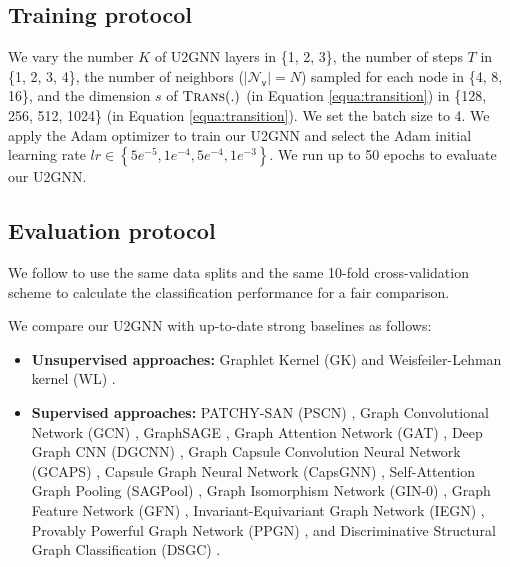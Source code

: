 \documentclass[twoside,leqno,twocolumn]{article}
\newcommand{\citep}{\cite}
\begin{document}
\subsection{Training protocol}
\label{subsec:training}


We vary the number $K$ of U2GNN layers in \{1, 2, 3\}, the number of steps $T$ in \{1, 2, 3, 4\}, the number of neighbors ($|\mathcal{N}_\mathsf{v}|=N$) sampled for each node in \{4, 8, 16\}, and the dimension $s$ of $\textsc{Trans}(.)$ (in Equation \ref{equa:transition}) in \{128, 256, 512, 1024\} (in Equation \ref{equa:transition}).
We set the batch size to 4.
We apply the Adam optimizer \citep{kingma2014adam} to train our U2GNN and select the Adam initial learning rate  $lr \in \left\{5e^{-5}, 1e^{-4}, 5e^{-4}, 1e^{-3}\right\}$.
We run up to 50 epochs to evaluate our U2GNN. 



\subsection{Evaluation protocol}
\label{subsec:eval}

{We follow \citep{xu2019powerful,xinyi2019capsule,maron2019provably,seo2019discriminative,Chen2019ArePG} to use the same data splits and the same 10-fold cross-validation scheme to calculate the classification performance for a fair comparison}.


We compare our U2GNN with up-to-date strong baselines as follows:
\begin{itemize}
\item \textbf{Unsupervised approaches:} 
Graphlet Kernel (GK) \citep{shervashidze2009efficient} and  Weisfeiler-Lehman kernel (WL) \citep{shervashidze2011weisfeiler}.

\item \textbf{Supervised approaches:} 
PATCHY-SAN (PSCN) \citep{niepert2016learning}, Graph Convolutional Network (GCN) \citep{kipf2017semi}, GraphSAGE \citep{hamilton2017inductive}, Graph Attention Network (GAT) \citep{velickovic2018graph}, Deep Graph CNN (DGCNN) \citep{zhang2018end}, Graph Capsule Convolution Neural Network (GCAPS) \citep{verma2018graph}, Capsule Graph Neural Network (CapsGNN) \citep{xinyi2019capsule}, Self-Attention Graph Pooling (SAGPool) \citep{Lee2019SelfAttentionGP}, Graph Isomorphism Network (GIN-0) \citep{xu2019powerful}, Graph Feature Network (GFN) \citep{Chen2019ArePG}, Invariant-Equivariant Graph Network (IEGN) \citep{maron2019invariant}, Provably Powerful Graph Network (PPGN) \citep{maron2019provably}, and Discriminative Structural Graph Classification (DSGC) \citep{seo2019discriminative}.
\end{itemize}
\end{document}
